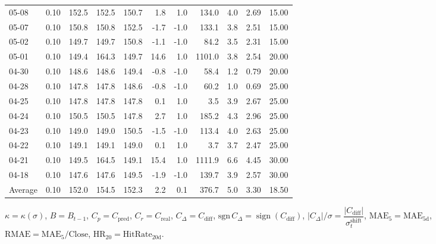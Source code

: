 \begin{threeparttable}
{\begin{tabular}{lrrrrrrrrrr}
05-08 & 0.10 & 152.5 & 152.5 & 150.7 & 1.8 & 1.0 & 134.0 & 4.0 & 2.69 & 15.00 \\
05-07 & 0.10 & 150.8 & 150.8 & 152.5 & -1.7 & -1.0 & 133.1 & 3.8 & 2.51 & 15.00 \\
05-02 & 0.10 & 149.7 & 149.7 & 150.8 & -1.1 & -1.0 & 84.2 & 3.5 & 2.31 & 15.00 \\
05-01 & 0.10 & 149.4 & 164.3 & 149.7 & 14.6 & 1.0 & 1101.0 & 3.8 & 2.54 & 20.00 \\
04-30 & 0.10 & 148.6 & 148.6 & 149.4 & -0.8 & -1.0 & 58.4 & 1.2 & 0.79 & 20.00 \\
04-28 & 0.10 & 147.8 & 147.8 & 148.6 & -0.8 & -1.0 & 60.2 & 1.0 & 0.69 & 25.00 \\
04-25 & 0.10 & 147.8 & 147.8 & 147.8 & 0.1 & 1.0 & 3.5 & 3.9 & 2.67 & 25.00 \\
04-24 & 0.10 & 150.5 & 150.5 & 147.8 & 2.7 & 1.0 & 185.2 & 4.3 & 2.96 & 25.00 \\
04-23 & 0.10 & 149.0 & 149.0 & 150.5 & -1.5 & -1.0 & 113.4 & 4.0 & 2.63 & 25.00 \\
04-22 & 0.10 & 149.1 & 149.1 & 149.0 & 0.1 & 1.0 & 3.7 & 3.7 & 2.47 & 25.00 \\
04-21 & 0.10 & 149.5 & 164.5 & 149.1 & 15.4 & 1.0 & 1111.9 & 6.6 & 4.45 & 30.00 \\
04-18 & 0.10 & 147.6 & 147.6 & 149.5 & -1.9 & -1.0 & 139.7 & 3.9 & 2.57 & 30.00 \\
Average & 0.10 & 152.0 & 154.5 & 152.3 & 2.2 & 0.1 & 376.7 & 5.0 & 3.30 & 18.50 \\
\bottomrule
\end{tabular}
}%
\begin{tablenotes}\footnotesize
\item $\kappa=\kappa(\sigma)$, $B=B_{t-1}$, $C_p=C_{\text{pred}}$, $C_r=C_{\text{real}}$, $C_\Delta=C_{\text{diff}}$, $\mathrm{sgn}\,C_\Delta=\operatorname{sign}(C_{\text{diff}})$, $|C_\Delta|/\sigma=\dfrac{|C_{\text{diff}}|}{\sigma_t^{\text{shift}}}$, $\mathrm{MAE}_5=\mathrm{MAE}_{5\text{d}}$, $\mathrm{RMAE}= \mathrm{MAE}_5 / \text{Close}$, $\mathrm{HR}_{20}=\mathrm{HitRate}_{20\text{d}}$.
\end{tablenotes}
\end{threeparttable}
\endgroup